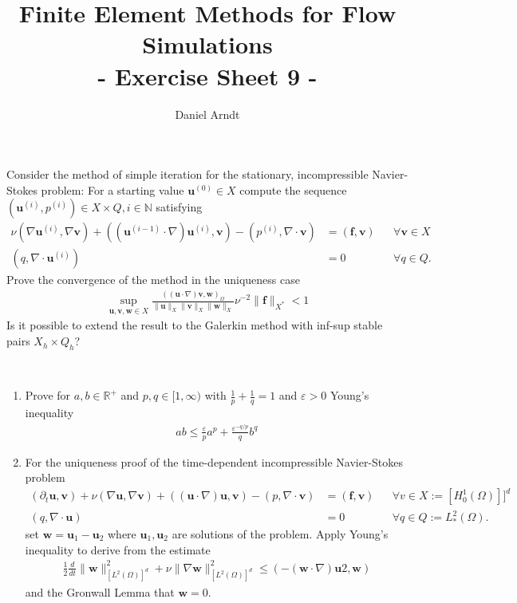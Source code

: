 \documentclass[12pt]{article}
\newcommand{\bu}{\boldsymbol{u}}
\newcommand{\bv}{\boldsymbol{v}}
\newcommand{\bw}{\boldsymbol{w}}
\newenvironment{exercise}[2][Exercise]{\begin{trivlist}
\item[\hskip \labelsep {\bfseries #1}\hskip \labelsep {\bfseries #2.}]}{\end{trivlist}}
\begin{document}
 
\title{Finite Element Methods for Flow Simulations\\ - Exercise Sheet 9 -}
\author{Daniel Arndt}
\date{}
\maketitle

\begin{exercise}{17}
Consider the method of simple iteration for the stationary, incompressible Navier-Stokes problem: 
For a starting value $\bu^{(0)} \in X$ compute the sequence $(\bu^{(i)}, p^{(i)}) \in X \times Q, i \in \mathbb{N}$ satisfying
\begin{align*}
\nu (\nabla \bu^{(i)} , \nabla \bv) + ((\bu^{(i-1)} \cdot \nabla )\bu^{(i)} , \bv) - (p^{(i)} , \nabla  \cdot \bv) &= (\boldsymbol{f} , \bv) &&\forall \bv \in X\\
(q, \nabla  \cdot \bu^{(i)}) &= 0
&&\forall q \in Q.
\end{align*}
Prove the convergence of the method in the uniqueness case
\begin{align*}
 \sup_{\bu,\bv,\bw\in X}\frac{((\bu \cdot \nabla )\bv, \bw)_\Omega}{\|\bu\|_X \|\bv\|_X \|\bw\|_X}
\nu^{-2} \|\boldsymbol{f}\|_{X^*} < 1
\end{align*}
Is it possible to extend the result to the Galerkin method with inf-sup stable pairs $X_h \times Q_h$?
\end{exercise}

\begin{exercise}{18}~
\begin{enumerate}
\item Prove for $a, b \in \mathbb{R}^+$ and $p, q \in [1, \infty)$ with $\frac{1}{p}+\frac{1}{q}=1$ and $\varepsilon>0$ Young's inequality
\begin{align*}
ab \leq \frac{\varepsilon}{p}a^p+\frac{\varepsilon^{-q/p}}{q}b^q
\end{align*}
\item For the uniqueness proof of the time-dependent incompressible Navier-Stokes problem
\begin{align*}
 (\partial_t \bu, \bv) + \nu (\nabla \bu, \nabla \bv) + ((\bu \cdot \nabla )\bu, \bv) - (p, \nabla  \cdot \bv) &= (\boldsymbol{f} , \bv) &&\forall v \in X := [H_0^1 (\Omega)]]^d \\
(q, \nabla  \cdot \bu) &= 0 &&\forall q \in Q := L^2_* (\Omega).
\end{align*}
set $\bw = \bu_1 -\bu_2$ where $\bu_1 , \bu_2$ are solutions of the problem. Apply Young's inequality to derive from the estimate
\begin{align*}
\frac{1}{2}\frac{d}{dt}\|\bw\|_{[L^2(\Omega)]^d}^2 + \nu  \|\nabla \bw\|_{[L^2(\Omega)]^d}^2 \leq (-(\bw \cdot \nabla )\bu 2 , \bw)
\end{align*}
and the Gronwall Lemma that $\bw = 0$.
\end{enumerate}
\end{exercise}
\end{document}
